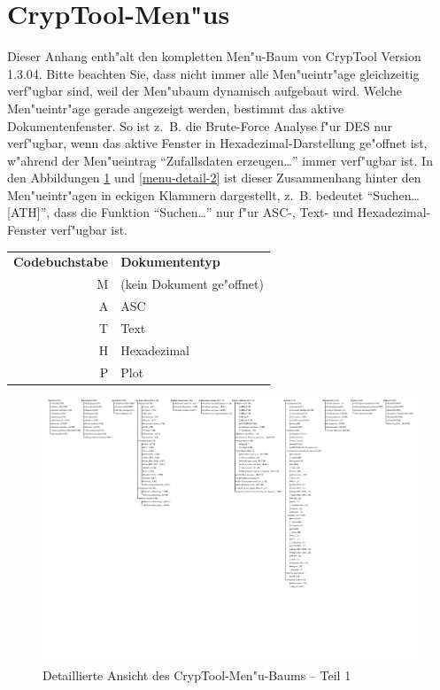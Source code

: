 
\enlargethispage{1cm}
\section{CrypTool-Men"us}
\hypertarget{appendix-menutree}{}\label{s:appendix-menutree}

Dieser Anhang enth"alt den kompletten Men"u-Baum von CrypTool Version 1.3.04.
Bitte beachten Sie, dass nicht immer alle Men"ueintr"age gleichzeitig
verf"ugbar sind, weil der Men"ubaum dynamisch aufgebaut wird. Welche
Men"ueintr"age gerade angezeigt werden, bestimmt das aktive Dokumentenfenster.
So ist z.~B.  die Brute-Force Analyse f"ur DES 
nur verf"ugbar, wenn das aktive
Fenster in Hexadezimal-Darstellung ge"offnet ist, w"ahrend der Men"ueintrag
"`Zufallsdaten erzeugen\dots"' immer verf"ugbar ist. In den Abbildungen
\ref{menu-detail-1} und \ref{menu-detail-2} ist dieser Zusammenhang hinter den
Men"ueintr"agen in eckigen Klammern dargestellt, z.~B. bedeutet
"`Suchen\dots[ATH]"', dass die Funktion "`Suchen\dots"' nur f"ur ASC-, Text-
und Hexadezimal-Fenster verf"ugbar ist.

\begin{center}
\begin{tabular}{rl}
\bf Codebuchstabe & \bf Dokumententyp \\
M & (kein Dokument ge"offnet)\\
A & ASC\\
T & Text\\
H & Hexadezimal\\
P & Plot\\
\end{tabular}
\end{center}

\nobreak

\begin{figure}[!hb]
\begin{center}
\includegraphics[scale=1.1, clip, viewport=10 340 426 600]{figures/cryptool-menu-detail-de}
\caption{Detaillierte Ansicht des CrypTool-Men"u-Baums -- Teil 1}
\label{menu-detail-1}
\end{center}
\end{figure}

